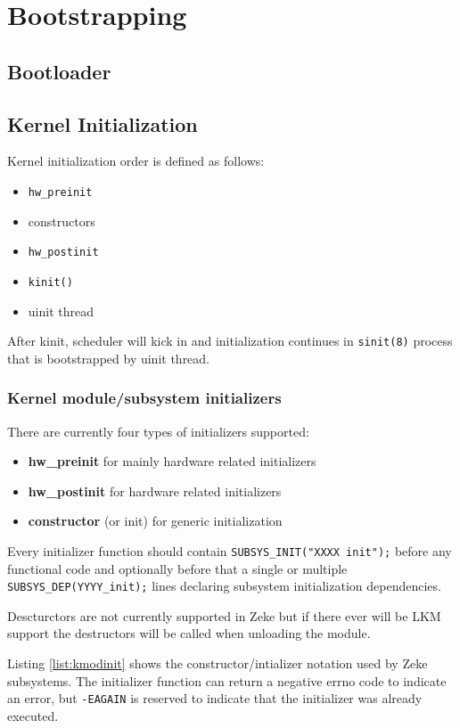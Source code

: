 \part{Bootstrapping}
\chapter{Bootloader}
\chapter{Kernel Initialization}

Kernel initialization order is defined as follows:
\begin{itemize}
    \item \verb+hw_preinit+
    \item constructors
    \item \verb+hw_postinit+
    \item \verb+kinit()+
    \item uinit thread
\end{itemize}

After kinit, scheduler will kick in and initialization continues in
\verb+sinit(8)+ process that is bootstrapped by uinit thread.

\section{Kernel module/subsystem initializers}

There are currently four types of initializers supported:

\begin{itemize}
    \item \textbf{hw\_preinit} for mainly hardware related initializers
    \item \textbf{hw\_postinit} for hardware related initializers
    \item \textbf{constructor} (or init) for generic initialization
\end{itemize}

Every initializer function should contain \verb+SUBSYS_INIT("XXXX init");+
before any functional code and optionally before that a single or multiple
\verb+SUBSYS_DEP(YYYY_init);+ lines declaring subsystem initialization
dependencies.

Descturctors are not currently supported in Zeke but if there ever will be LKM
support the destructors will be called when unloading the module.

Listing \ref{list:kmodinit} shows the constructor/intializer notation used by
Zeke subsystems. The initializer function can return a negative errno code to
indicate an error, but \verb+-EAGAIN+ is reserved to indicate that the
initializer was already executed.

